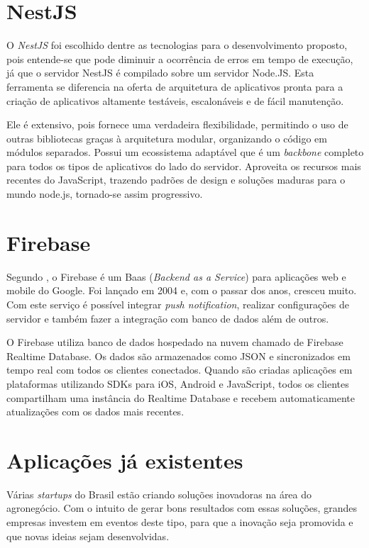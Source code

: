 \section{NestJS}
O \textit{NestJS} foi escolhido dentre as tecnologias para o desenvolvimento proposto, pois entende-se que pode diminuir a ocorrência de erros em tempo de execução, já que o servidor NestJS é compilado sobre um servidor Node.JS. Esta ferramenta se diferencia na oferta de arquitetura de aplicativos pronta para a criação de aplicativos altamente testáveis, escalonáveis e de fácil manutenção.

Ele é extensivo, pois fornece uma verdadeira flexibilidade, permitindo o uso de outras bibliotecas graças à arquitetura modular, organizando o código em módulos separados. Possui um ecossistema adaptável que é um \textit{backbone} completo para todos os tipos de aplicativos do lado do servidor. Aproveita os recursos mais recentes do JavaScript, trazendo padrões de design e soluções maduras para o mundo node.js, tornado-se assim progressivo. \cite{nest}

\section{Firebase}
Segundo , o Firebase é um Baas (\textit{Backend as a Service}) para aplicações web e mobile do Google. Foi lançado em 2004 e, com o passar dos anos, cresceu muito. Com este serviço é possível integrar \textit{push notification}, realizar configurações de servidor e também fazer a integração com banco de dados além de outros.

O Firebase utiliza banco de dados hospedado na nuvem chamado de Firebase Realtime Database. Os dados são armazenados como JSON e sincronizados em tempo real com todos os clientes conectados. Quando são criadas aplicações em plataformas utilizando SDKs para iOS, Android e JavaScript, todos os clientes compartilham uma instância do Realtime Database e recebem automaticamente atualizações com os dados mais recentes.  \cite{firebase1} 

\section{Aplicações já existentes}
Várias \textit{startups} do Brasil estão criando soluções inovadoras na área do agronegócio. Com o intuito de gerar bons resultados com essas soluções, grandes empresas investem em eventos deste tipo, para que a inovação seja promovida e que novas ideias sejam desenvolvidas.

